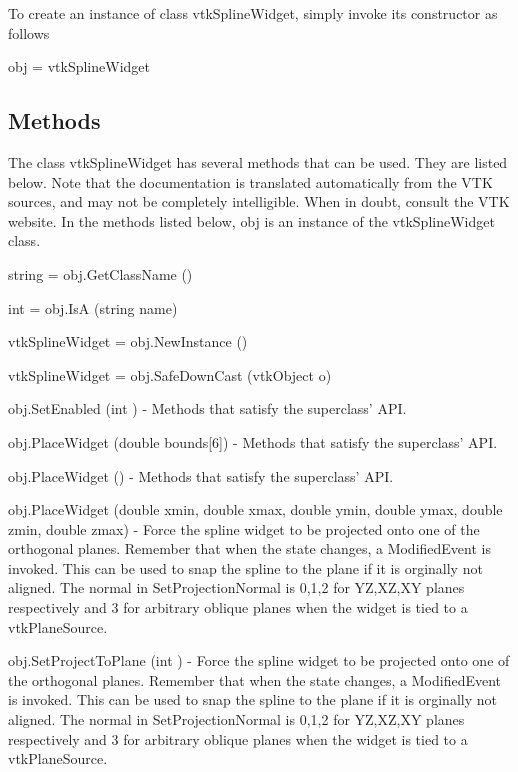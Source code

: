 To create an instance of class vtk\-Spline\-Widget, simply invoke its constructor as follows \begin{DoxyVerb}  obj = vtkSplineWidget
\end{DoxyVerb}
 \hypertarget{vtkwidgets_vtkxyplotwidget_Methods}{}\subsection{Methods}\label{vtkwidgets_vtkxyplotwidget_Methods}
The class vtk\-Spline\-Widget has several methods that can be used. They are listed below. Note that the documentation is translated automatically from the V\-T\-K sources, and may not be completely intelligible. When in doubt, consult the V\-T\-K website. In the methods listed below, {\ttfamily obj} is an instance of the vtk\-Spline\-Widget class. 
\begin{DoxyItemize}
\item {\ttfamily string = obj.\-Get\-Class\-Name ()}  
\item {\ttfamily int = obj.\-Is\-A (string name)}  
\item {\ttfamily vtk\-Spline\-Widget = obj.\-New\-Instance ()}  
\item {\ttfamily vtk\-Spline\-Widget = obj.\-Safe\-Down\-Cast (vtk\-Object o)}  
\item {\ttfamily obj.\-Set\-Enabled (int )} -\/ Methods that satisfy the superclass' A\-P\-I.  
\item {\ttfamily obj.\-Place\-Widget (double bounds\mbox{[}6\mbox{]})} -\/ Methods that satisfy the superclass' A\-P\-I.  
\item {\ttfamily obj.\-Place\-Widget ()} -\/ Methods that satisfy the superclass' A\-P\-I.  
\item {\ttfamily obj.\-Place\-Widget (double xmin, double xmax, double ymin, double ymax, double zmin, double zmax)} -\/ Force the spline widget to be projected onto one of the orthogonal planes. Remember that when the state changes, a Modified\-Event is invoked. This can be used to snap the spline to the plane if it is orginally not aligned. The normal in Set\-Projection\-Normal is 0,1,2 for Y\-Z,X\-Z,X\-Y planes respectively and 3 for arbitrary oblique planes when the widget is tied to a vtk\-Plane\-Source.  
\item {\ttfamily obj.\-Set\-Project\-To\-Plane (int )} -\/ Force the spline widget to be projected onto one of the orthogonal planes. Remember that when the state changes, a Modified\-Event is invoked. This can be used to snap the spline to the plane if it is orginally not aligned. The normal in Set\-Projection\-Normal is 0,1,2 for Y\-Z,X\-Z,X\-Y planes respectively and 3 for arbitrary oblique planes when the widget is tied to a vtk\-Plane\-Source.  

\end{DoxyItemize}
